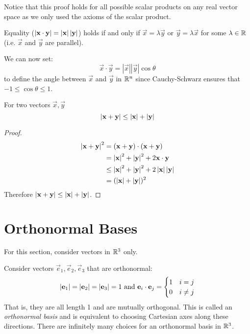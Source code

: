 \documentclass[../main.tex]{subfiles}
\begin{document}
Notice that this proof holds for all possible scalar products on any real vector space as we only used the axioms of the scalar product.
\begin{remark}
  Equality ($\abs{\vec{x} \cdot \vec{y}} = \abs{\vec{x}}\abs{\vec{y}}$) holds if and only if $\vec{x} = \lambda \vec{y}$ or $\vec{y} = \lambda \vec{x}$ for some $\lambda \in \R$ (i.e. $\vec{x}$ and $\vec{y}$ are parallel).
\end{remark}
We can now set:
\[
  \vec{x} \cdot \vec{y} = |\vec{x}||\vec{y}|\cos\theta
\]
to define the angle between $\vec{x}$ and $\vec{y}$ in $\R^{n}$ since Cauchy-Schwarz ensures that $-1 \leq \cos \theta \leq 1$.
\begin{corollary}
  For two vectors $\vec{x}, \vec{y}$
  \[
    \abs{\vec{x} + \vec{y}} \leq \abs{\vec{x}} + \abs{\vec{y}}
  \]
\end{corollary}
\begin{proof}
  \begin{align*}
    \abs{\vec{x} + \vec{y}}^2 &= (\vec{x} + \vec{y}) \cdot (\vec{x} + \vec{y}) \\
                              &= \abs{\vec{x}}^2 + \abs{\vec{y}}^2 + 2 \vec{x} \cdot \vec{y} \\
                              &\leq \abs{\vec{x}}^2 + \abs{\vec{y}}^2 + 2 \abs{\vec{x}}\abs{\vec{y}} \\
                              &= (\abs{\vec{x}} + \abs{\vec{y}})^2
  \end{align*}
  Therefore $\abs{\vec{x} + \vec{y}} \leq \abs{\vec{x}} + \abs{\vec{y}}$.
\end{proof}

\section{Orthonormal Bases}
\begin{remark}[Note]
For this section, consider vectors in $\R^{3}$ only.
\end{remark}
Consider vectors $\vec{e}_1, \vec{e}_2, \vec{e}_3$ that are orthonormal:
\[
  \abs{\vec{e}_1} = \abs{\vec{e}_2} = \abs{\vec{e}_3} = 1 \text{ and } \vec{e}_i \cdot \vec{e}_j = \begin{cases}
  1 & i=j \\
  0 & i\neq j
  \end{cases}
\]
That is, they are all length 1 and are mutually orthogonal.
This is called an \textit{orthonormal basis} and is equivalent to choosing Cartesian axes along these directions.
There are infinitely many choices for an orthonormal basis in $\R^{3}$.
\end{document}

